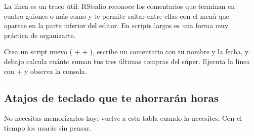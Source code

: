 La línea  es un truco útil: RStudio
reconoce los comentarios que terminan en cuatro guiones o más como
 y te permite saltar entre ellas con el menú que aparece
en la parte inferior del editor. En scripts largos es una forma muy práctica
de organizarte.

\begin{hazlotu}
Crea un script nuevo ( +  + ), escribe un
comentario con tu nombre y la fecha, y debajo calcula cuánto suman tus tres
últimas compras del súper. Ejecuta la línea con  +
 y observa la consola.
\end{hazlotu}

\subsection{Atajos de teclado que te ahorrarán horas}

No necesitas memorizarlos hoy; vuelve a esta tabla cuando la necesites. Con
el tiempo los usarás sin pensar.

